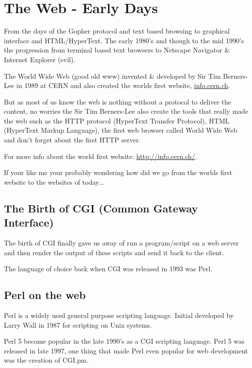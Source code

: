 \documentclass{book}
\begin{document}
\chapter{The Web - Early Days}
From the days of the Gopher protocol and text based browsing to graphical interface and HTML/HyperText. The early 1980's and though to the mid 1990's the progression from terminal based text browsers to Netscape Navigator \& Internet Explorer (evil).

The World Wide Web (good old www) invented \& developed by Sir Tim Berners-Lee in 1989 at CERN and also created the worlds first website,
\href{http://info.cern.ch/hypertext/WWW/TheProject.html}{info.cern.ch}\cite{wiki-History-of-the-internet, cern}.

But as most of us know the web is nothing without a protocol to deliver the content, no worries the Sir Tim Berners-Lee also create the tools that really made the web such as the HTTP protocol (HyperText Transfer Protocol), HTML (HyperText Markup Language), the first web browser called World Wide Web and don't forget about the first HTTP server\cite{wiki-History-of-the-web}.

For more info about the world first website: \href{http://info.cern.ch/}{http://info.cern.ch/}.

If your like me your probably wondering how did we go from the worlds first website to the websites of today\ldots{}

\section{The Birth of CGI (Common Gateway Interface)}
The birth of CGI finally gave us away of run a program/script on a web server and then render the output of these scripts and send it back to the client.

The language of choice back when CGI was released in 1993\cite{royal-pingdom} was Perl.

\section{Perl on the web}
Perl is a widely used general purpose scripting language. Initial developed by Larry Wall in 1987 for scripting on Unix systems.

Perl 5 become popular in the late 1990's as a CGI scripting language. Perl 5 was released in late 1997, one thing that made Perl even popular for web development was the creation of CGI.pm.
\end{document}
